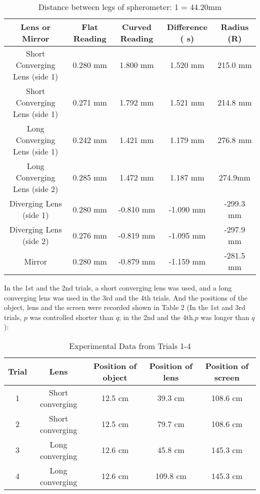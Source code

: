 \documentclass[12pt]{article}
\begin{document}
	

	\begin{table}[H]
\caption{Distance between legs of spherometer: 1 = 44.20mm}
\centering
	
\begin{tabular}[width=05\linewidth]{ccccc}
  	Lens or Mirror 	&Flat Reading	&Curved Reading	&Difference ( s)	&Radius (R)	\\
  	\hline
Short Converging Lens (side 1)	&0.280 mm &1.800 mm &1.520 mm &215.0 mm\\		
Short Converging Lens (side 1)	&0.271 mm &1.792 mm &1.521 mm &214.8 mm
\\
Long Converging Lens (side 1)	&0.242 mm &1.421 mm &1.179 mm &276.8 mm
\\	
Long Converging Lens (side 2)	&0.285 mm &1.472 mm &1.187 mm &274.9mm
\\	
Diverging Lens (side 1)	&0.280 mm &-0.810 mm &-1.090 mm &-299.3 mm\\	
Diverging Lens (side 2)	&0.276 mm &-0.819 mm &-1.095 mm &-297.9 mm\\	
Mirror	&0.280 mm &-0.879 mm &-1.159 mm &-281.5 mm\\	
      \hline
      \end{tabular}
\end{table}

In the 1st and the 2nd trials, a short converging lens was used, and a long converging lens was used in the 3rd and the 4th trials. And the positions of the object, lens and the screen were recorded shown in Table 2 (In the 1st and 3rd trials, $p$ was controlled shorter than $q$; in the 2nd and the 4th,$p$ was longer than $q$):
\begin{table}[H]
\caption{Experimental Data from Trials 1-4}
\centering
\begin{tabular}[width=05\linewidth]{ccccc}
     
Trial 	&Lens	&Position of object	&Position of lens	&Position of screen\\
\hline
1 &Short converging &12.5 cm &39.3 cm &108.6 cm\\
2 &Short converging &12.5 cm &79.7 cm &108.6 cm\\
3 &Long converging &12.6 cm &45.8 cm &145.3 cm\\
4 &Long converging &12.6 cm &109.8 cm &145.3 cm\\



      \hline
      \end{tabular}
\end{table}
\end{document}
